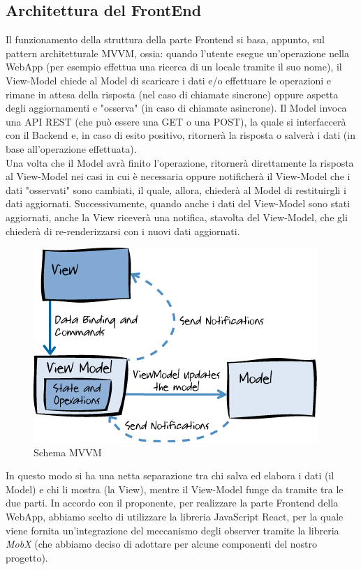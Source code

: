 \subsection{Architettura del FrontEnd}

Il funzionamento della struttura della parte Frontend si basa, appunto, sul pattern architetturale MVVM, ossia: quando l’utente esegue un’operazione nella WebApp (per esempio effettua una ricerca di un locale tramite il suo nome), il View-Model chiede al Model di scaricare i dati e/o effettuare le operazioni e rimane in attesa della risposta (nel caso di chiamate sincrone) oppure aspetta degli aggiornamenti e "osserva" (in caso di chiamate asincrone). Il Model invoca una API REST (che può essere una GET o una POST), la quale si interfaccerà con il Backend e, in caso di esito positivo, ritornerà la risposta o salverà i dati (in base all'operazione effettuata). \\
Una volta che il Model avrà finito l'operazione, ritornerà direttamente la risposta al View-Model nei casi in cui è necessaria oppure notificherà il View-Model che i dati "osservati" sono cambiati, il quale, allora, chiederà al Model di restituirgli i dati aggiornati. Successivamente, quando anche i dati del View-Model sono stati aggiornati, anche la View riceverà una notifica, stavolta del View-Model, che gli chiederà di re-renderizzarsi con i nuovi dati aggiornati. 



\begin{figure}[H]
    \centering
    \includegraphics[scale=0.5]{Contenuto/Immagini/MVVM.png}
    \caption{Schema MVVM}
\end{figure}

In questo modo si ha una netta separazione tra chi salva ed elabora i dati (il Model) e chi li mostra (la View), mentre il View-Model funge da tramite tra le due parti. 
In accordo con il proponente, per realizzare la parte Frontend della WebApp, abbiamo scelto di utilizzare la libreria JavaScript React, per la quale viene fornita un'integrazione del meccanismo degli observer tramite la libreria \textit{MobX} (che abbiamo deciso di adottare per alcune componenti del nostro progetto).


